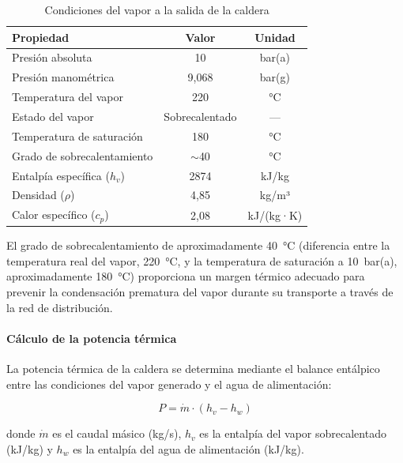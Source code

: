 \documentclass[12pt]{article}
\begin{document}
\begin{table}[H]
	\centering
	\caption{Condiciones del vapor a la salida de la caldera}
	\label{tab:condiciones-salida-caldera}
	\begin{tabular}{lcc}
		\toprule
		\textbf{Propiedad}          & \textbf{Valor} & \textbf{Unidad} \\
		\midrule
		Presión absoluta            & 10             & bar(a)          \\
		Presión manométrica         & 9,068          & bar(g)          \\
		Temperatura del vapor       & 220            & °C              \\
		Estado del vapor            & Sobrecalentado & ---             \\
		Temperatura de saturación   & 180            & °C              \\
		Grado de sobrecalentamiento & $\sim$40       & °C              \\
		Entalpía específica ($h_v$) & 2874           & kJ/kg           \\
		Densidad ($\rho$)           & 4,85           & kg/m³           \\
		Calor específico ($c_p$)    & 2,08           & kJ/(kg·K)       \\
		\bottomrule
	\end{tabular}
\end{table}

El grado de sobrecalentamiento de aproximadamente 40~°C (diferencia entre la temperatura real del vapor, 220~°C, y la temperatura de saturación a 10~bar(a), aproximadamente 180~°C) proporciona un margen térmico adecuado para prevenir la condensación prematura del vapor durante su transporte a través de la red de distribución.

\paragraph{Cálculo de la potencia térmica}

La potencia térmica de la caldera se determina mediante el balance entálpico entre las condiciones del vapor generado y el agua de alimentación:

\begin{equation}
	P = \dot{m} \cdot (h_v - h_w)
	\label{eq:potencia-termica-caldera}
\end{equation}

\noindent donde $\dot{m}$ es el caudal másico (kg/s), $h_v$ es la entalpía del vapor sobrecalentado (kJ/kg) y $h_w$ es la entalpía del agua de alimentación (kJ/kg).
\end{document}
